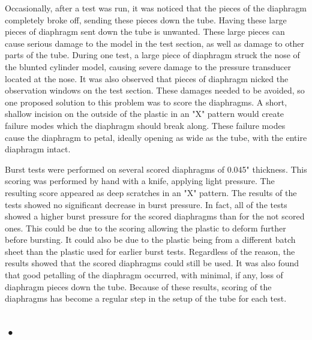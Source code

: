Occasionally, after a test was run, it was noticed that the pieces of the diaphragm completely broke off, sending these pieces down the tube. Having these large pieces of diaphragm sent down the tube is unwanted. These large pieces can cause serious damage to the model in the test section, as well as damage to other parts of the tube. During one test, a large piece of diaphragm struck the nose of the blunted cylinder model, causing severe damage to the pressure transducer located at the nose. It was also observed that pieces of diaphragm nicked the observation windows on the test section. These damages needed to be avoided, so one proposed solution to this problem was to score the diaphragms. A short, shallow incision on the outside of the plastic in an "X" pattern would create failure modes which the diaphragm should break along. These failure modes cause the diaphragm to petal, ideally opening as wide as the tube, with the entire diaphragm intact. 

Burst tests were performed on several scored diaphragms of 0.045" thickness.  This scoring was performed by hand with a knife, applying light pressure. The resulting score appeared as deep scratches in an "X" pattern. The results of the tests showed no significant decrease in burst pressure. In fact, all of the tests showed a higher burst pressure for the scored diaphragms than for the not scored ones. This could be due to the scoring allowing the plastic to deform further before bursting. It could also be due to the plastic being from a different batch sheet than the plastic used for earlier burst tests. Regardless of the reason, the results showed that the scored diaphragms could still be used. It was also found that good petalling of the diaphragm occurred, with minimal, if any, loss of diaphragm pieces down the tube. Because of these results, scoring of the diaphragms has become a regular step in the setup of the tube for each test.  




\subsection{•}


